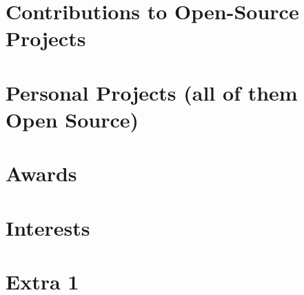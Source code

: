 \documentclass[11pt,a4paper]{moderncv}
\begin{document}
\section{Contributions to Open-Source Projects}

\section{Personal Projects (all of them Open Source)}

\section{Awards}

\section{Interests}

\section{Extra 1}

\renewcommand{\listitemsymbol}{-} %

\end{document}
